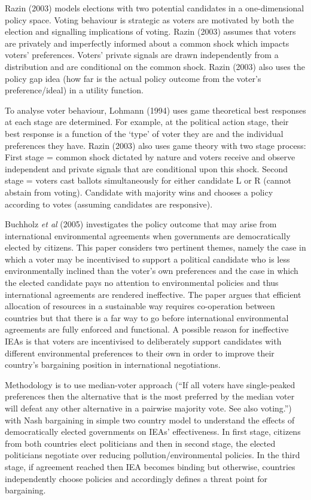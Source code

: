\documentclass[11pt,preprint, authoryear]{elsarticle}
\numberwithin{equation}{section}
\numberwithin{figure}{section}
\numberwithin{table}{section}
\begin{document}
Razin (2003) models elections with two potential candidates in a
one-dimensional policy space. Voting behaviour is strategic as voters
are motivated by both the election and signalling implications of
voting. Razin (2003) assumes that voters are privately and imperfectly
informed about a common shock which impacts voters' preferences. Voters'
private signals are drawn independently from a distribution and are
conditional on the common shock. Razin (2003) also uses the policy gap
idea (how far is the actual policy outcome from the voter's
preference/ideal) in a utility function.

To analyse voter behaviour, Lohmann (1994) uses game theoretical best
responses at each stage are determined. For example, at the political
action stage, their best response is a function of the `type' of voter
they are and the individual preferences they have. Razin (2003) also
uses game theory with two stage process: First stage = common shock
dictated by nature and voters receive and observe independent and
private signals that are conditional upon this shock. Second stage =
voters cast ballots simultaneously for either candidate L or R (cannot
abstain from voting). Candidate with majority wins and chooses a policy
according to votes (assuming candidates are responsive).

Buchholz \emph{et al} (2005) investigates the policy outcome that may
arise from international environmental agreements when governments are
democratically elected by citizens. This paper considers two pertinent
themes, namely the case in which a voter may be incentivised to support
a political candidate who is less environmentally inclined than the
voter's own preferences and the case in which the elected candidate pays
no attention to environmental policies and thus international agreements
are rendered ineffective. The paper argues that efficient allocation of
resources in a sustainable way requires co-operation between countries
but that there is a far way to go before international environmental
agreements are fully enforced and functional. A possible reason for
ineffective IEAs is that voters are incentivised to deliberately support
candidates with different environmental preferences to their own in
order to improve their country's bargaining position in international
negotiations.

Methodology is to use median-voter approach (``If all voters have
single-peaked preferences then the alternative that is the most
preferred by the median voter will defeat any other alternative in a
pairwise majority vote. See also voting.'') with Nash bargaining in
simple two country model to understand the effects of democratically
elected governments on IEAs' effectiveness. In first stage, citizens
from both countries elect politicians and then in second stage, the
elected politicians negotiate over reducing pollution/environmental
policies. In the third stage, if agreement reached then IEA becomes
binding but otherwise, countries independently choose policies and
accordingly defines a threat point for bargaining.
\end{document}
